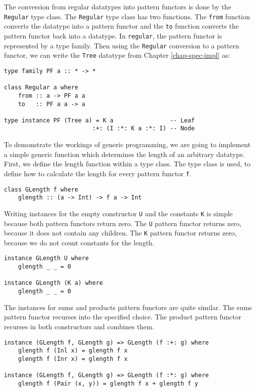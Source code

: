 The conversion from regular datatypes into pattern functors is done by the \texttt{Regular} type class. The \texttt{Regular} type class has two functions. The \texttt{from} function converts the datatype into a pattern functor and the \texttt{to} function converts the pattern functor back into a datatype. In \texttt{regular}, the pattern functor is represented by a type family. Then using the \texttt{Regular} conversion to a pattern functor, we can write the \texttt{Tree} datatype from Chapter \ref{chap-spec-impl} as:

\begin{verbatim}
type family PF a :: * -> *

class Regular a where
    from :: a -> PF a a
    to   :: PF a a -> a

type instance PF (Tree a) = K a                -- Leaf
                         :+: (I :*: K a :*: I) -- Node
\end{verbatim}

To demonstrate the workings of generic programming, we are going to implement a simple generic function which determines the length of an arbitrary datatype. First, we define the length function within a type class. The type class is used, to define how to calculate the length for every pattern functor \texttt{f}. 

\begin{verbatim}
class GLength f where
    glength :: (a -> Int) -> f a -> Int
\end{verbatim}

Writing instances for the empty constructor \texttt{U} and the constants \texttt{K} is simple because both pattern functors return zero. The \texttt{U} pattern functor returns zero, because it does not contain any children. The \texttt{K} pattern functor returns zero, because we do not count constants for the length. 

\begin{verbatim}
instance GLength U where
    glength _ _ = 0

instance GLength (K a) where
    glength _ _ = 0
\end{verbatim}

The instances for sums and products pattern functors are quite similar. The sums pattern functor recurses into the specified choice. The product pattern functor recurses in both constructors and combines them.

\begin{verbatim}
instance (GLength f, GLength g) => GLength (f :+: g) where
    glength f (Inl x) = glength f x
    glength f (Inr x) = glength f x

instance (GLength f, GLength g) => GLength (f :*: g) where
    glength f (Pair (x, y)) = glength f x + glength f y
\end{verbatim}


